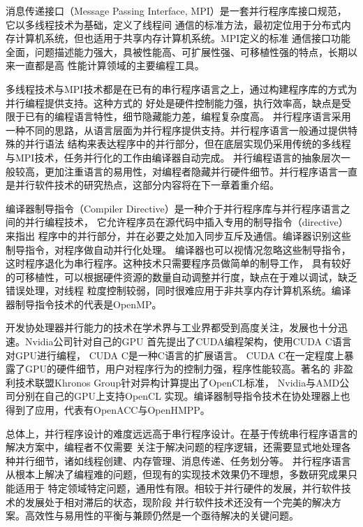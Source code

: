 消息传递接口（Message Passing Interface, MPI）是一套并行程序库接口规范，
它以多线程技术为基础，定义了线程间
通信的标准方法，最初定位用于分布式内存计算机系统，但也适用于共享内存计算机系统。MPI定义的标准
通信接口功能全面，问题描述能力强大，具被性能高、可扩展性强、可移植性强的特点，长期以来一直都是高
性能计算领域的主要编程工具。

多线程技术与MPI技术都是在已有的串行程序语言之上，通过构建程序库的方式为并行编程提供支持。这种方式的
好处是硬件控制能力强，执行效率高，缺点是受限于已有的编程语言特性，细节隐藏能力差，编程复杂度高。
并行程序语言采用一种不同的思路，从语言层面为并行程序提供支持。并行程序语言一般通过提供特殊的并行语法
结构来表达程序中的并行部分，但在底层实现仍采用传统的多线程与MPI技术，任务并行化的工作由编译器自动完成。
并行编程语言的抽象层次一般较高，更加注重语言的易用性，对编程者隐藏并行硬件细节。并行程序语言一直
是并行软件技术的研究热点，这部分内容将在下一章着重介绍。

编译器制导指令（Compiler Directive）是一种介于并行程序库与并行程序语言之间的并行编程技术，
它允许程序员在源代码中插入专用的制导指令（directive）来指出
程序中的并行部分，并在必要之处加入同步互斥及通信。编译器识别这些制导指令，对程序做自动并行化处理。
编译器也可以视情况忽略这些制导指令，这时程序退化为串行程序。这种技术只需要程序员做简单的制导工作，
具有较好的可移植性，可以根据硬件资源的数量自动调整并行度，缺点在于难以调试，缺乏错误处理，对线程
粒度控制较弱，同时很难应用于非共享内存计算机系统。编译器制导指令技术的代表是OpenMP。

开发协处理器并行能力的技术在学术界与工业界都受到高度关注，发展也十分迅速。Nvidia公司针对自己的GPU
首先提出了CUDA编程架构，使用CUDA C语言对GPU进行编程，
CUDA C是一种C语言的扩展语言。
CUDA C在一定程度上暴露了GPU的硬件细节，用户对程序行为的控制力强，程序性能较高。著名的
非盈利技术联盟Khronos Group针对异构计算提出了OpenCL标准，
Nvidia与AMD公司分别在自己的GPU上支持OpenCL
实现。编译器制导指令技术在协处理器上也得到了应用，代表有OpenACC与OpenHMPP。

总体上，并行程序设计的难度远远高于串行程序设计。在基于传统串行程序语言的解决方案中，编程者不仅需要
关注于解决问题的程序逻辑，还需要显式地处理各种并行细节，诸如线程创建、内存管理、消息传递、任务划分等。
并行程序语言从根本上解决了编程难的问题，但现有的实现技术效果仍不理想，多数研究成果只能适用于
特定领域特定问题，通用性有限。相较于并行硬件的发展，并行软件技术的发展处于相对滞后的状态，现阶段
并行软件技术还没有一个完美的解决方案。高效性与易用性的平衡与兼顾仍然是一个亟待解决的关键问题。

